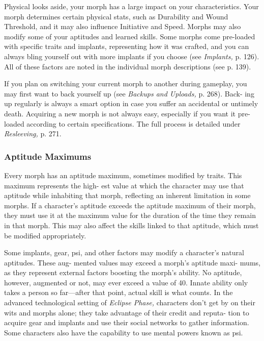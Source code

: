 Physical looks aside, your morph has a large impact 
on your characteristics. Your morph determines certain 
physical stats, such as Durability and Wound Threshold, 
and it may also influence Initiative and Speed. Morphs 
may also modify some of your aptitudes and learned 
skills. Some morphs come pre-loaded with specific traits 
and implants, representing how it was crafted, and you 
can always bling yourself out with more implants if 
you choose (see \textit{Implants,} p. 126). All of these factors 
are noted in the individual morph descriptions (see 
p. 139).

If you plan on switching your current morph to 
another during gameplay, you may first want to back 
yourself up (see \textit{Backups and Uploads,} p. 268). Back-
ing up regularly is always a smart option in case you 
suffer an accidental or untimely death. Acquiring a 
new morph is not always easy, especially if you want 
it pre-loaded according to certain specifications. The 
full process is detailed under \textit{Resleeving,} p. 271.

\subsubsection{Aptitude Maximums}

Every morph has an aptitude maximum, sometimes 
modified by traits. This maximum represents the high-
est value at which the character may use that aptitude 
while inhabiting that morph, reflecting an inherent 
limitation in some morphs. If a character's aptitude 
exceeds the aptitude maximum of their morph, they 
must use it at the maximum value for the duration 
of the time they remain in that morph. This may also 
affect the skills linked to that aptitude, which must be 
modified appropriately.

Some implants, gear, psi, and other factors may 
modify a character's natural aptitudes. These aug-
mented values may exceed a morph's aptitude maxi-
mums, as they represent external factors boosting the 
morph's ability. No aptitude, however, augmented or 
not, may ever exceed a value of 40. Innate ability only 
takes a person so far—after that point, actual skill is 
what counts.
In the advanced technological setting of \textit{Eclipse Phase,} 
characters don't get by on their wits and morphs 
alone; they take advantage of their credit and reputa-
tion to acquire gear and implants and use their social 
networks to gather information. Some characters also 
have the capability to use mental powers known as psi.

